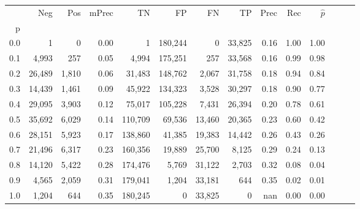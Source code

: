 \begin{tabular}{rrrrrrrrrrrrrr}
\toprule
{} &     Neg &    Pos & mPrec &       TN &       FP &      FN &      TP &  Prec &   Rec & $\hat{p}$ \\
p   &         &        &       &          &          &         &         &       &       &           \\
\midrule
0.0 &       1 &      0 &  0.00 &        1 &  180,244 &       0 &  33,825 &  0.16 &  1.00 &      1.00 \\
0.1 &   4,993 &    257 &  0.05 &    4,994 &  175,251 &     257 &  33,568 &  0.16 &  0.99 &      0.98 \\
0.2 &  26,489 &  1,810 &  0.06 &   31,483 &  148,762 &   2,067 &  31,758 &  0.18 &  0.94 &      0.84 \\
0.3 &  14,439 &  1,461 &  0.09 &   45,922 &  134,323 &   3,528 &  30,297 &  0.18 &  0.90 &      0.77 \\
0.4 &  29,095 &  3,903 &  0.12 &   75,017 &  105,228 &   7,431 &  26,394 &  0.20 &  0.78 &      0.61 \\
0.5 &  35,692 &  6,029 &  0.14 &  110,709 &   69,536 &  13,460 &  20,365 &  0.23 &  0.60 &      0.42 \\
0.6 &  28,151 &  5,923 &  0.17 &  138,860 &   41,385 &  19,383 &  14,442 &  0.26 &  0.43 &      0.26 \\
0.7 &  21,496 &  6,317 &  0.23 &  160,356 &   19,889 &  25,700 &   8,125 &  0.29 &  0.24 &      0.13 \\
0.8 &  14,120 &  5,422 &  0.28 &  174,476 &    5,769 &  31,122 &   2,703 &  0.32 &  0.08 &      0.04 \\
0.9 &   4,565 &  2,059 &  0.31 &  179,041 &    1,204 &  33,181 &     644 &  0.35 &  0.02 &      0.01 \\
1.0 &   1,204 &    644 &  0.35 &  180,245 &        0 &  33,825 &       0 &   nan &  0.00 &      0.00 \\
\bottomrule
\end{tabular}
